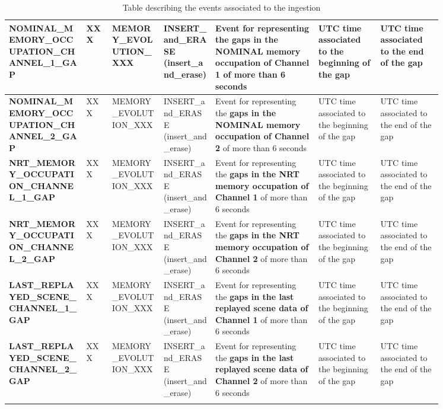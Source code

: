 \begin{landscape}
\begin{longtable}{|M{0.15\linewidth}|M{0.05\linewidth}|M{0.10\linewidth}|M{0.10\linewidth}|M{0.2\linewidth}|M{0.125\linewidth}|M{0.125\linewidth}|}
    \textbf{NOMINAL\_MEMORY\_OCCUPATION\_CHANNEL\_1\_GAP} & XXX & \- MEMORY\_EVOLUTION\_XXX & INSERT\_and\_ERASE (insert\_and\_erase) & Event for representing the \textbf{gaps in the NOMINAL memory occupation of Channel 1} of more than 6 seconds & UTC time associated to the beginning of the gap & UTC time associated to the end of the gap  \\ \hline
    \textbf{NOMINAL\_MEMORY\_OCCUPATION\_CHANNEL\_2\_GAP} & XXX & \- MEMORY\_EVOLUTION\_XXX & INSERT\_and\_ERASE (insert\_and\_erase) & Event for representing the \textbf{gaps in the NOMINAL memory occupation of Channel 2} of more than 6 seconds& UTC time associated to the beginning of the gap & UTC time associated to the end of the gap  \\ \hline
    \textbf{NRT\_MEMORY\_OCCUPATION\_CHANNEL\_1\_GAP} & XXX & \- MEMORY\_EVOLUTION\_XXX & INSERT\_and\_ERASE (insert\_and\_erase) & Event for representing the \textbf{gaps in the NRT memory occupation of Channel 1} of more than 6 seconds& UTC time associated to the beginning of the gap & UTC time associated to the end of the gap  \\ \hline
    \textbf{NRT\_MEMORY\_OCCUPATION\_CHANNEL\_2\_GAP} & XXX & \- MEMORY\_EVOLUTION\_XXX & INSERT\_and\_ERASE (insert\_and\_erase) & Event for representing the \textbf{gaps in the NRT memory occupation of Channel 2} of more than 6 seconds& UTC time associated to the beginning of the gap & UTC time associated to the end of the gap  \\ \hline
    \textbf{LAST\_REPLAYED\_SCENE\_CHANNEL\_1\_GAP} & XXX & \- MEMORY\_EVOLUTION\_XXX & INSERT\_and\_ERASE (insert\_and\_erase) & Event for representing the \textbf{gaps in the last replayed scene data of Channel 1} of more than 6 seconds& UTC time associated to the beginning of the gap & UTC time associated to the end of the gap  \\ \hline
    \textbf{LAST\_REPLAYED\_SCENE\_CHANNEL\_2\_GAP} & XXX & \- MEMORY\_EVOLUTION\_XXX & INSERT\_and\_ERASE (insert\_and\_erase) & Event for representing the \textbf{gaps in the last replayed scene data of Channel 2} of more than 6 seconds& UTC time associated to the beginning of the gap & UTC time associated to the end of the gap  \\ \hline
    \caption{Table describing the events associated to the ingestion}
    \label{tb:description_events_ingestion_tlm_req_b}
    \end{longtable}
    \end{landscape}